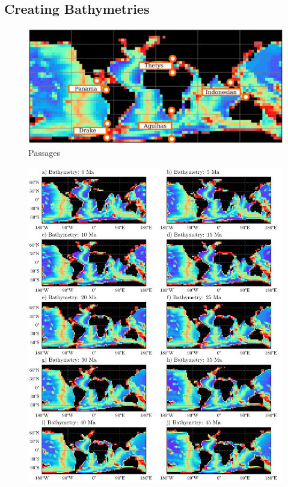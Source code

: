 \documentclass[a4paper]{article}
\begin{document}
\begin{multicols}{2}
\subsection{Creating Bathymetries}

\end{multicols}
\begin{figure}[H]
	\includegraphics[width=\linewidth]{passages.png}
	\caption{Passages}
	\label{fig:passages}
\end{figure}
\begin{figure}[H]
	\includegraphics[width=\linewidth]{bathymetries_1_crop.pdf}
\end{figure}
\end{document}

